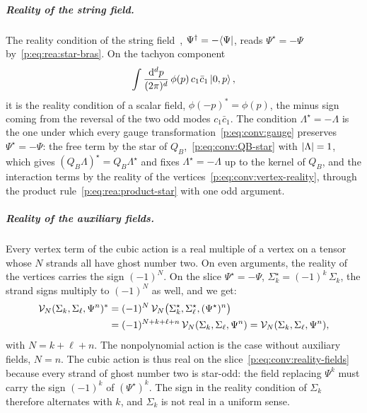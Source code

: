 \subparagraph{Reality of the string field.}

The reality condition of the string field~\cite[eq.~(3.6)]{Zwiebach:1993:ClosedStringField}, ${\Psi^\dagger} = - \mathinner{{}_{}\hspace{-2pt}\langle \Psi |}$, reads $\Psi^\star = - \Psi$ by~\eqref{p:eq:rea:star-bras}.
On the tachyon component
\begin{equation}
\int \frac{\mathrm{d}^d p}{(2 \pi)^d} \, \phi(p) \, c_1 \bar c_1 \ket{0, p},
\end{equation}
it is the reality condition of a scalar field, $\phi(- p)^* = \phi(p)$, the minus sign coming from the reversal of the two odd modes $c_1 \bar c_1$.
The condition $\Lambda^\star = - \Lambda$ is the one under which every gauge transformation~\eqref{p:eq:conv:gauge} preserves $\Psi^\star = - \Psi$: the free term by the star of $Q_B$,~\eqref{p:eq:conv:QB-star} with ${|\Lambda|} = 1$, which gives $(Q_B \Lambda)^\star = Q_B \Lambda^\star$ and fixes $\Lambda^\star = - \Lambda$ up to the kernel of $Q_B$, and the interaction terms by the reality of the vertices~\eqref{p:eq:conv:vertex-reality}, through the product rule~\eqref{p:eq:rea:product-star} with one odd argument.

\subparagraph{Reality of the auxiliary fields.}

Every vertex term of the cubic action is a real multiple of a vertex on a tensor whose $N$ strands all have ghost number two.
On even arguments, the reality of the vertices carries the sign $(-1)^N$.
On the slice $\Psi^\star = - \Psi$, $\Sigma_k^\star = (-1)^k \, \Sigma_k$, the strand signs multiply to $(-1)^N$ as well, and we get:
\begin{equation}
\label{p:eq:rea:cubic-real}
\begin{aligned}
  \mathcal{V}_{N}(\Sigma_k, \Sigma_\ell, \Psi^n)^*
    &
    = (-1)^N \, \mathcal{V}_{N}\big( \Sigma_k^\star, \Sigma_\ell^\star, (\Psi^\star)^n \big)
  \\
    &
    = (-1)^{N + k + \ell + n} \, \mathcal{V}_{N}(\Sigma_k, \Sigma_\ell, \Psi^n)
    = \mathcal{V}_{N}(\Sigma_k, \Sigma_\ell, \Psi^n),
\end{aligned}
\end{equation}
with $N = k + \ell + n$.
The nonpolynomial action is the case without auxiliary fields, $N = n$.
The cubic action is thus real on the slice~\eqref{p:eq:conv:reality-fields} because every strand of ghost number two is star-odd: the field replacing $\Psi^k$ must carry the sign $(-1)^k$ of $(\Psi^\star)^k$.
The sign in the reality condition of $\Sigma_k$ therefore alternates with $k$, and $\Sigma_k$ is not real in a uniform sense.

